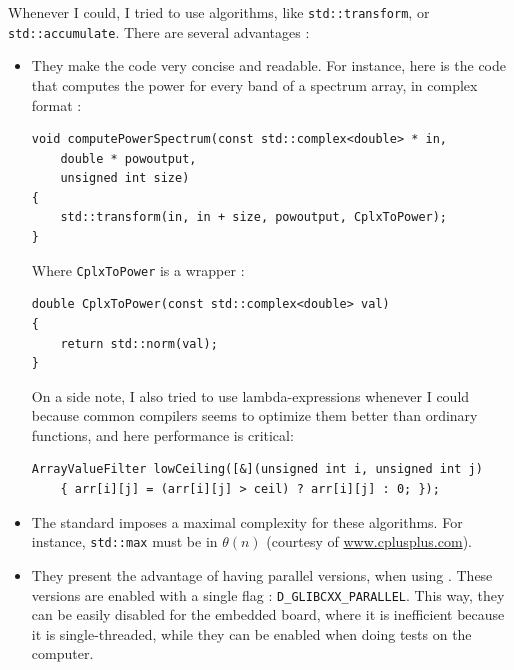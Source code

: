 Whenever I could, I tried to use  algorithms, like \texttt{std::transform}, or \texttt{std::accumulate}.
There are several advantages : 
\begin{itemize}
\item They make the code very concise and readable. For instance, here is the code that computes the power for every band of a spectrum array, in complex format : 
\begin{lstlisting}[caption=math\_util.cpp]
void computePowerSpectrum(const std::complex<double> * in, 
	double * powoutput, 
	unsigned int size)
{
	std::transform(in, in + size, powoutput, CplxToPower);
}
\end{lstlisting}

Where \texttt{CplxToPower} is a wrapper : 
\begin{lstlisting}[caption=math\_util.cpp]
double CplxToPower(const std::complex<double> val)
{
	return std::norm(val);
}
\end{lstlisting}

On a side note, I also tried to use lambda-expressions whenever I could because common compilers seems to optimize them better than ordinary functions\cite[p.~213]{cppstl}, and here performance is critical:

\begin{lstlisting}[caption=estimation/wavelets/cwt\_wavelet\_estimator.cpp]
ArrayValueFilter lowCeiling([&](unsigned int i, unsigned int j)
	{ arr[i][j] = (arr[i][j] > ceil) ? arr[i][j] : 0; });
\end{lstlisting}


\item The  standard imposes a maximal complexity for these algorithms. For instance, \texttt{std::max} must be in $\theta(n)$ (courtesy of \url{www.cplusplus.com}).
\item They present the advantage of having parallel versions, when using . These versions are enabled with a single  flag : \texttt{D\_GLIBCXX\_PARALLEL}. This way, they can be easily disabled for the embedded board, where it is inefficient because it is single-threaded, while they can be enabled when doing tests on the computer. 
\end{itemize}


